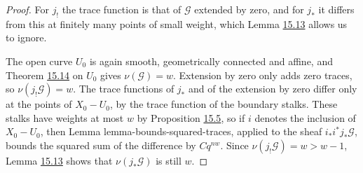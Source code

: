 \documentclass[11pt]{article}
\begin{document}
\begin{proof}[{Proof}]\label{bp45}%
For \(j_!\) the trace function is that of \(\mathcal G\) extended by zero, and for \(j_*\) it differs from this at finitely many points of small weight, which Lemma \hyperref[bp38]{15.13} allows us to ignore.

The open curve \(U_0\) is again smooth, geometrically connected and affine, and Theorem \hyperref[bp41]{15.14} on \(U_0\) gives \(\nu(\mathcal G)=w\). Extension by zero only adds zero traces, so \(\nu(j_!\mathcal G)=w\). The trace functions of \(j_*\) and of the extension by zero differ only at the points of \(X_0-U_0\), by the trace function of the boundary stalks. These stalks have weights at most \(w\) by Proposition \hyperref[bp13]{15.5}, so if \(i\) denotes the inclusion of \(X_0-U_0\), then Lemma lemma-bounds-squared-traces, applied to the sheaf \(i_*i^*j_*\mathcal G\), bounds the squared sum of the difference by \(Cq^{nw}\). Since \(\nu(j_!\mathcal G)=w>w-1\), Lemma \hyperref[bp38]{15.13} shows that \(\nu(j_*\mathcal G)\) is still \(w\).
\end{proof}



\clearpage{}\hypertarget{bp-outside}{}%
\end{document}
